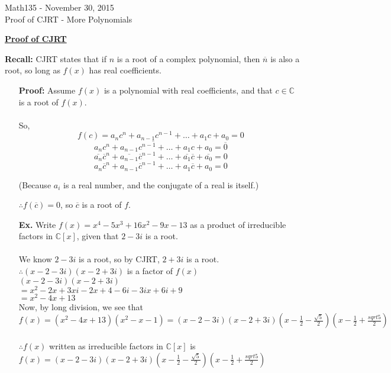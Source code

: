 \documentclass{letter}
\begin{document}
	\begin{center}
		\LARGE Math135 - November 30, 2015\\
		\large Proof of CJRT - More Polynomials
	\end{center}
	\vspace{0.25 in}
	\underline{\textbf{Proof of CJRT}}
	
	\textbf{Recall: } CJRT states that if $n$ is a root of a complex polynomial, then $\overline{n}$ is also a root, so long as $f(x)$ has real coefficients.\\
	\begin{itemize}
		\item[\textbf{Proof: }] Assume $f(x)$ is a polynomial with real coefficients, and that $c \in \mathbb{C}$ is a root of $f(x)$.\\\\
		So,\\
		\[f(c) = a_nc^n + a_{n-1}c^{n-1} + \dots + a_1c + a_0 = 0\]
		\[\overline{a_nc^n + a_{n-1}c^{n-1} + \dots + a_1c + a_0} = \overline{0}\]
		\[\overline{a_n} \overline{c}^n + \overline{a_{n-1}} \overline{c}^{n-1} + \dots + \overline{a_1} \overline{c} + \overline{a_0} = 0\]
		\[ a_n \overline{c}^n + a_{n-1} \overline{c}^{n-1} + \dots + a_1 \overline{c} + a_0 = 0 \]
		\begin{center}(Because $a_i$ is a real number, and the conjugate of a real is itself.)\end{center}
		$\therefore f(\overline{c}) = 0$, so $\overline{c}$ is a root of $f$.\\
		\item[\textbf{Ex. }] Write $f(x) = x^4 - 5x^3 + 16x^2 - 9x - 13$ as a product of irreducible factors in $\mathbb{C} \left[ x \right]$, given that $2-3i$ is a root.\\\\We know $2-3i$ is a root, so by CJRT, $2+3i$ is a root. $\therefore (x - 2 - 3i)(x - 2 + 3i)$ is a factor of $f(x)$\\
		$(x - 2 - 3i)(x-2+3i)$\\
		$= x^2 - 2x + 3xi - 2x + 4 - 6i - 3ix + 6i + 9$\\
		$= x^2 - 4x + 13$\\
		Now, by long division, we see that $f(x) = (x^2 - 4x + 13)(x^2 - x - 1) = (x - 2 - 3i)(x - 2 +3i)(x - \frac{1}{2} - \frac{\sqrt5}{2})(x - \frac12 + \frac{sqrt5}{2})$\\\\
		$\therefore f(x)$ written as irreducible factors in $\mathbb{C} \left[ x \right]$ is $f(x) =  (x - 2 - 3i)(x - 2 +3i)(x - \frac{1}{2} - \frac{\sqrt5}{2})(x - \frac12 + \frac{sqrt5}{2})$\\

\end{itemize}
\end{document}
